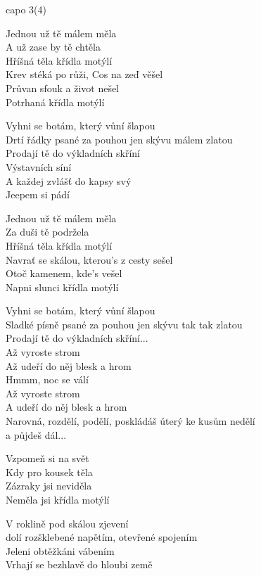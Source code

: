 \re{}capo 3(4) 

\ve{}
Jednou už tě málem měla\\
A už zase by tě chtěla\\
Hříšná těla křídla motýlí\\
Krev stéká po růži, Cos na zeď věšel\\
Průvan sfouk a život nešel\\
Potrhaná křídla motýlí

\cho{}
Vyhni se botám, který vůní šlapou\\
Drtí řádky psané za pouhou jen skývu málem zlatou\\
Prodají tě do výkladních skříní\\
Výstavních síní\\
A každej zvlášť do kapsy svý\\
Jeepem si pádí

\ve{}
Jednou už tě málem měla\\
Za duši tě podržela\\
Hříšná těla křídla motýlí\\
Navrať se skálou, kterou's z cesty sešel\\
Otoč kamenem, kde's vešel\\
Napni slunci křídla motýlí

\cho{}
Vyhni se botám, který vůní šlapou\\
Sladké písně psané za pouhou jen skývu tak tak zlatou\\
Prodají tě do výkladních skříní...\\


\re{*}
Až vyroste strom\\
Až udeří do něj blesk a hrom\\
Hmmm, noc se válí\\
Až vyroste strom\\
A udeří do něj blesk a hrom\\
Narovná, rozdělí, podělí, poskládáš úterý ke kusům nedělí\\
a půjdeš dál...

\re{*}
Vzpomeň si na svět\\
Kdy pro kousek těla\\
Zázraky jsi neviděla\\
Neměla jsi křídla motýlí

\re{*}
V roklině pod skálou zjevení\\
dolí rozšklebené napětím, otevřené spojením\\
Jeleni obtěžkáni vábením\\
Vrhají se bezhlavě do hloubi země

\esong{}